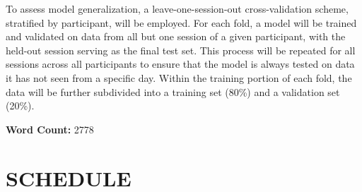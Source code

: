 \documentclass[12pt, a4paper]{article}
\begin{document}
To assess model generalization, a leave-one-session-out cross-validation scheme, stratified by participant, will be employed. For each fold, a model will be trained and validated on data from all but one session of a given participant, with the held-out session serving as the final test set. This process will be repeated for all sessions across all participants to ensure that the model is always tested on data it has not seen from a specific day. Within the training portion of each fold, the data will be further subdivided into a training set (80\%) and a validation set (20\%).

\vspace{1em}
\noindent\textbf{Word Count:} 2778
\newpage
\section{SCHEDULE}
\end{document}
